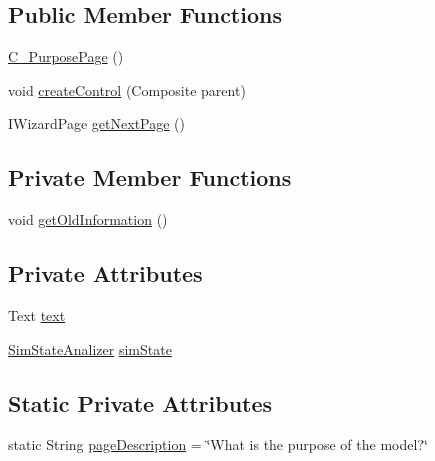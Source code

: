 \subsection*{Public Member Functions}
\begin{DoxyCompactItemize}
\item 
\hyperlink{classit_1_1isislab_1_1masonhelperdocumentation_1_1mason_1_1wizards_1_1_c___purpose_page_a1c03f292ba0afb1b2be5dd26f8cd3035}{C\-\_\-\-Purpose\-Page} ()
\item 
void \hyperlink{classit_1_1isislab_1_1masonhelperdocumentation_1_1mason_1_1wizards_1_1_c___purpose_page_a735f845063e27f169ea0481efe337aa7}{create\-Control} (Composite parent)
\item 
I\-Wizard\-Page \hyperlink{classit_1_1isislab_1_1masonhelperdocumentation_1_1mason_1_1wizards_1_1_c___purpose_page_ab720ad0f2b4d6f2276b8cc4deaa83d0d}{get\-Next\-Page} ()
\end{DoxyCompactItemize}
\subsection*{Private Member Functions}
\begin{DoxyCompactItemize}
\item 
void \hyperlink{classit_1_1isislab_1_1masonhelperdocumentation_1_1mason_1_1wizards_1_1_c___purpose_page_acb3c2b59b784cc1d761a9d95b5300bb8}{get\-Old\-Information} ()
\end{DoxyCompactItemize}
\subsection*{Private Attributes}
\begin{DoxyCompactItemize}
\item 
Text \hyperlink{classit_1_1isislab_1_1masonhelperdocumentation_1_1mason_1_1wizards_1_1_c___purpose_page_abeec86a6fae75f2a485faeade141dd81}{text}
\item 
\hyperlink{classit_1_1isislab_1_1masonhelperdocumentation_1_1analizer_1_1_sim_state_analizer}{Sim\-State\-Analizer} \hyperlink{classit_1_1isislab_1_1masonhelperdocumentation_1_1mason_1_1wizards_1_1_c___purpose_page_a8441e960f1ba3f3315168635e8976822}{sim\-State}
\end{DoxyCompactItemize}
\subsection*{Static Private Attributes}
\begin{DoxyCompactItemize}
\item 
static String \hyperlink{classit_1_1isislab_1_1masonhelperdocumentation_1_1mason_1_1wizards_1_1_c___purpose_page_a1e19f349d9008f860de96a145f5ea5e7}{page\-Description} = \char`\"{}What is the purpose of the model?\char`\"{}
\end{DoxyCompactItemize}


